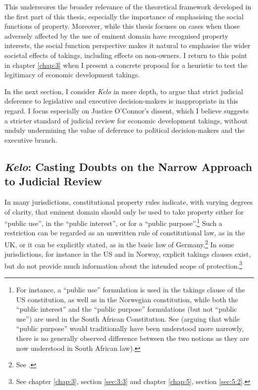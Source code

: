 This underscores the broader relevance of the theoretical framework developed in the first part of this thesis, especially the importance of emphasising the social functions of property. Moreover, while this thesis focuses on cases when those adversely affected by the use of eminent domain have recognised property interests, the social function perspective makes it natural to emphasise the wider societal effects of takings, including effects on non-owners. I return to this point in chapter \ref{chap:3} when I present a concrete proposal for a heuristic to test the legitimacy of economic development takings.

In the next section, I consider {\it Kelo} in more depth, to argue that strict judicial deference to legislative and executive decision-makers is inappropriate in this regard. I focus especially on Justice O'Connor's dissent, which I believe suggests a stricter standard of judicial review for economic development takings, without unduly undermining the value of deference to political decision-makers and the executive branch.

\subsection{{\it Kelo}: Casting Doubts on the Narrow Approach to Judicial Review}\label{sec:2:6:1}

In many jurisdictions, constitutional property rules indicate, with varying degrees of clarity, that eminent domain should only be used to take property either for ``public use'', in the ``public interest'', or for a ``public purpose''.\footnote{For instance, a ``public use'' formulation is used in the takings clause of the US constitution, as well as in the Norwegian constitution, while both the ``public interest'' and the ``public purpose'' formulations (but not ``public use'') are used in the South African Constitution. See \cite[462]{walt11} (arguing that while ``public purpose'' would traditionally have been understood more narrowly, there is no generally observed difference between the two notions as they are now understood in South African law).} Such a restriction can be regarded as an unwritten rule of constitutional law, as in the UK, or it can be explicitly stated, as in the basic law of Germany.\footnote{See \cite[3-4]{sluysmans15}.} In some jurisdictions, for instance in the US and in Norway, explicit takings clauses exist, but do not provide much information about the intended scope of protection.\footnote{See chapter \ref{chap:3}, section \ref{sec:3:3} and chapter \ref{chap:5}, section \ref{sec:5:2}.}

